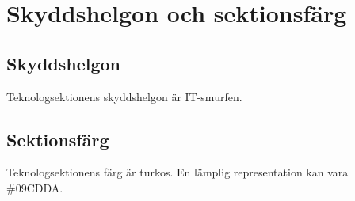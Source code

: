 \section{Skyddshelgon och sektionsfärg}

\subsection{Skyddshelgon}
Teknologsektionens skyddshelgon är IT-smurfen.

\subsection{Sektionsfärg}
Teknologsektionens färg är turkos. En lämplig representation kan vara \#09CDDA.
